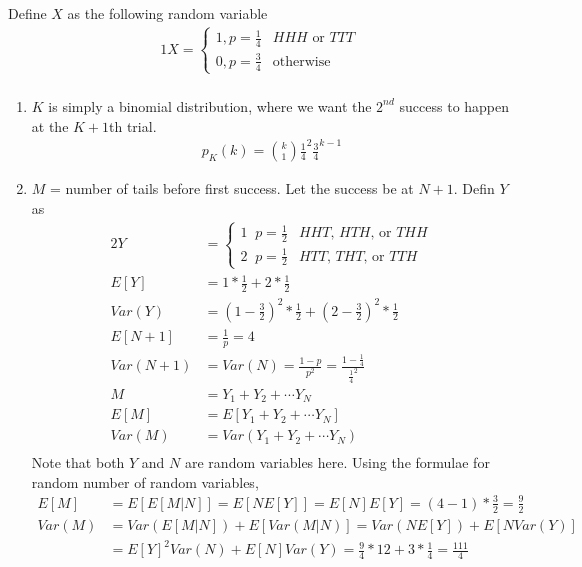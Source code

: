 \documentclass[../../probability-notes.tex]{subfiles}
\begin{document}
        Define $X$ as the following random variable
        \begin{alignat*}{1}
            X = \begin{cases} 1, p = \frac{1}{4} &\mbox{$HHH$ or $TTT$}\\
                             0, p = \frac{3}{4} &\mbox{otherwise} \end{cases}\\
        \end{alignat*}

        \begin{enumerate}
            \item $K$ is simply a binomial distribution, where we want the $2^{nd}$ success to happen at the $K+1$th trial.
            \begin{align*}
                p_{K}(k) = \binom{k}{1}\frac{1}{4}^{2}\frac{3}{4}^{k-1} \tag*{since the last trial is success}
            \end{align*}

            \item $M$ = number of tails before first success. Let the success be at $N+1$. Defin $Y$ as
            \begin{alignat*}{2}
                Y &= \begin{cases} 1\;\; p=\frac{1}{2} &\mbox{$HHT$, $HTH$, or $THH$}\\
                                 2\;\; p=\frac{1}{2} &\mbox{$HTT$, $THT$, or $TTH$} \end{cases}\\
                E[Y] &= 1 * \frac{1}{2} + 2 * \frac{1}{2}\\
                Var(Y) &= (1 - \frac{3}{2})^{2} * \frac{1}{2} + (2 - \frac{3}{2})^{2} * \frac{1}{2}\\
                E[N+1] &= \frac{1}{p} = 4\\
                Var(N+1) &= Var(N) = \frac{1-p}{p^{2}} = \frac{1 - \frac{1}{4}}{\frac{1}{4}^{2}}\\
                M &= Y_{1} + Y_{2} + \cdots Y_{N}\\
                E[M] &= E[Y_{1} + Y_{2} + \cdots Y_{N}]\\
                Var(M) &= Var(Y_{1} + Y_{2} + \cdots Y_{N})\\
            \end{alignat*}
            Note that both $Y$ and $N$ are random variables here. Using the formulae for random number of random variables,
            \begin{align*}
                E[M] &= E[E[M|N]] = E[NE[Y]] = E[N]E[Y] = (4-1) * \frac{3}{2} = \frac{9}{2}\\
                Var(M) &= Var(E[M|N]) + E[Var(M|N)] = Var(NE[Y]) + E[NVar(Y)]\\ 
                    &= E[Y]^{2}Var(N) + E[N]Var(Y) = \frac{9}{4} * 12 + 3 * \frac{1}{4} = \frac{111}{4}
            \end{align*}

        \end{enumerate}
\end{document}
